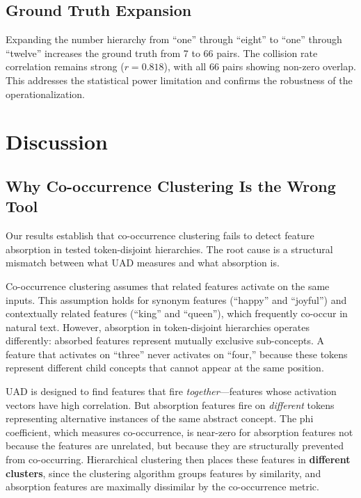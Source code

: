 \documentclass{article}
\begin{document}
\subsection{Ground Truth Expansion}

Expanding the number hierarchy from ``one'' through ``eight'' to ``one'' through ``twelve'' increases the ground truth from 7 to 66 pairs. The collision rate correlation remains strong ($r = 0.818$), with all 66 pairs showing non-zero overlap. This addresses the statistical power limitation and confirms the robustness of the operationalization.

\section{Discussion}
\label{sec:discussion}

\subsection{Why Co-occurrence Clustering Is the Wrong Tool}

Our results establish that co-occurrence clustering fails to detect feature absorption in tested token-disjoint hierarchies. The root cause is a structural mismatch between what UAD measures and what absorption is.

Co-occurrence clustering assumes that related features activate on the same inputs. This assumption holds for synonym features (``happy'' and ``joyful'') and contextually related features (``king'' and ``queen''), which frequently co-occur in natural text. However, absorption in token-disjoint hierarchies operates differently: absorbed features represent mutually exclusive sub-concepts. A feature that activates on ``three'' never activates on ``four,'' because these tokens represent different child concepts that cannot appear at the same position.

UAD is designed to find features that fire \emph{together}---features whose activation vectors have high correlation. But absorption features fire on \emph{different} tokens representing alternative instances of the same abstract concept. The phi coefficient, which measures co-occurrence, is near-zero for absorption features not because the features are unrelated, but because they are structurally prevented from co-occurring. Hierarchical clustering then places these features in \textbf{different clusters}, since the clustering algorithm groups features by similarity, and absorption features are maximally dissimilar by the co-occurrence metric.
\end{document}
